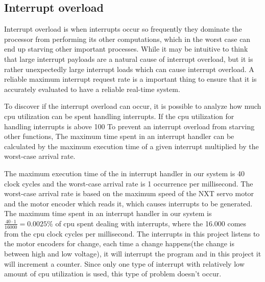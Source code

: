 \subsection{Interrupt overload}
\label{sec:Interrupt overload}


Interrupt overload is when interrupts occur so frequently they dominate the processor from performing its other computations, which in the worst case can end up starving other important processes. While it may be intuitive to think that large interrupt payloads are a natural cause of interrupt overload, but it is rather unexpectedly large interrupt loads which can cause interrupt overload. A reliable maximum interrupt request rate is a important thing to ensure that it is accurately evaluated to have a reliable real-time system.


To discover if the interrupt overload can occur, it is possible to analyze how much cpu utilization can be spent handling interrupts. If the cpu utilization for handling interrupts is above 100%
To prevent an interrupt overload from starving other functions,
The maximum time spent in an interrupt handler can be calculated by the maximum execution time of a given interrupt multiplied by the worst-case arrival rate. 

The maximum execution time of the in interrupt handler in our system is 40 clock cycles and the worst-case arrival rate is 1 occurrence per millisecond. The worst-case arrival rate is based on the maximum speed of the NXT servo motor and the motor encoder which reads it, which causes interrupts to be generated. \newline
The maximum time spent in an interrupt handler in our system is \begin{math} \frac{40 \cdot 1}{16000} = 0.0025\% \end{math} of cpu spent dealing with interrupts, where the 16.000 comes from the cpu clock cycles per millisecond. The interrupts in this project listens to the motor encoders for change, each time a change happens(the change is between high and low voltage), it will interrupt the program and in this project it will increment a counter. Since only one type of interrupt with relatively low amount of cpu utilization is used, this type of problem doesn’t occur. 

